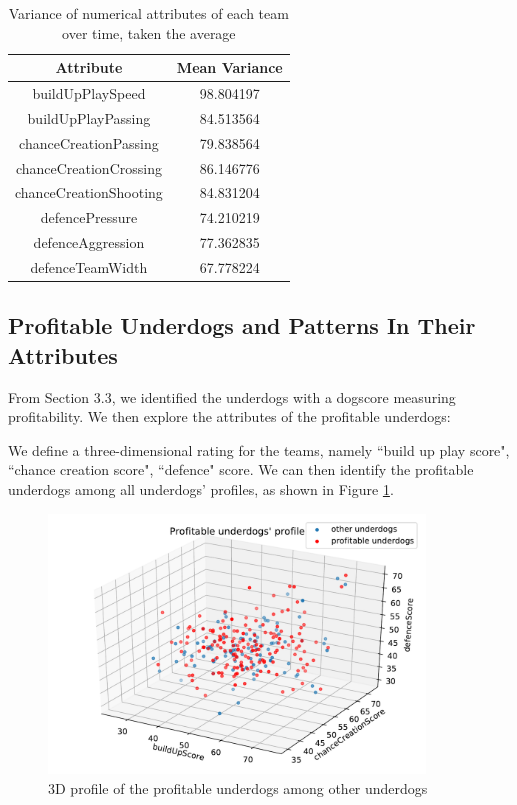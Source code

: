\documentclass[12pt, a4paper]{article}
\begin{document}
\begin{itemize}
    \begin{table}[!ht]
        \centering
        \begin{tabular}{ |c|c| } 
        \hline
        Attribute & Mean Variance \\
        \hline
        buildUpPlaySpeed   &       98.804197\\
        buildUpPlayPassing      &  84.513564\\
        chanceCreationPassing    & 79.838564\\
        chanceCreationCrossing   & 86.146776\\
        chanceCreationShooting  &  84.831204\\
        defencePressure         &  74.210219\\
        defenceAggression       &  77.362835\\
        defenceTeamWidth        &  67.778224\\
        \hline
        \end{tabular}
        \label{tab:meanvar}
        \caption{Variance of numerical attributes of         each team over time, taken the average }
    \end{table}
\end{itemize}

\subsection{Profitable Underdogs and Patterns In Their Attributes}
From Section 3.3, we identified the underdogs with a dogscore measuring profitability. We then explore the attributes of the profitable underdogs:

We define a three-dimensional rating for the teams, namely ``build up play score", ``chance creation score", ``defence" score. We can then identify the profitable underdogs among all underdogs' profiles, as shown in Figure \ref{fig:underdog3d}.

\begin{figure}[!ht]
    \centering
    \includegraphics[width=10cm]{dog1.pdf}
    \caption{3D profile of the profitable underdogs among other underdogs}
    \label{fig:underdog3d}
\end{figure}
\end{document}
